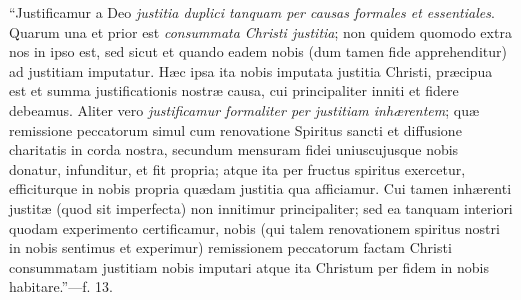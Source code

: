 ``Justificamur a Deo \emph{justitia duplici tanquam per causas
formales et essentiales}. Quarum una et prior est \emph{consummata
Christi justitia}; non quidem quomodo extra nos in ipso est, sed
sicut et quando eadem nobis (dum tamen fide apprehenditur) ad
justitiam imputatur. Hæc ipsa ita nobis imputata justitia Christi,
præcipua est et summa justificationis nostræ causa, cui
principaliter inniti et fidere debeamus. Aliter vero \emph{justificamur
formaliter per justitiam inhærentem}; quæ remissione peccatorum
simul cum renovatione Spiritus sancti et diffusione charitatis in
corda nostra, secundum mensuram fidei uniuscujusque nobis donatur,
infunditur, et fit propria; atque ita per fructus spiritus exercetur,
efficiturque in nobis propria quædam justitia qua afficiamur. Cui
tamen inhærenti justitæ (quod sit imperfecta) non innitimur
principaliter; sed ea tanquam interiori quodam experimento
certificamur, nobis (qui talem renovationem spiritus nostri in nobis
sentimus et experimur) remissionem peccatorum factam Christi
consummatam justitiam nobis imputari atque ita Christum per fidem in
nobis habitare.''—f. 13.

